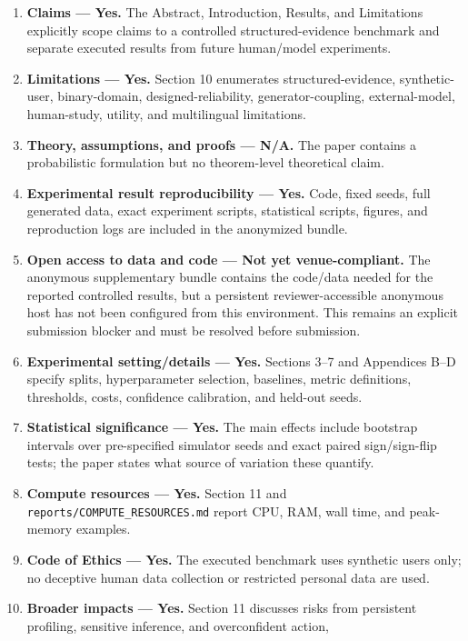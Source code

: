 \documentclass[
  10pt,
  letterpaper,
]{article}
\providecommand{\tightlist}{%
  \setlength{\itemsep}{0pt}\setlength{\parskip}{0pt}}
\begin{document}
\begin{enumerate}
\def\labelenumi{\arabic{enumi}.}
\tightlist
\item
  \textbf{Claims --- Yes.} The Abstract, Introduction, Results, and
  Limitations explicitly scope claims to a controlled
  structured-evidence benchmark and separate executed results from
  future human/model experiments.
\item
  \textbf{Limitations --- Yes.} Section 10 enumerates
  structured-evidence, synthetic-user, binary-domain,
  designed-reliability, generator-coupling, external-model, human-study,
  utility, and multilingual limitations.
\item
  \textbf{Theory, assumptions, and proofs --- N/A.} The paper contains a
  probabilistic formulation but no theorem-level theoretical claim.
\item
  \textbf{Experimental result reproducibility --- Yes.} Code, fixed
  seeds, full generated data, exact experiment scripts, statistical
  scripts, figures, and reproduction logs are included in the anonymized
  bundle.
\item
  \textbf{Open access to data and code --- Not yet venue-compliant.} The
  anonymous supplementary bundle contains the code/data needed for the
  reported controlled results, but a persistent reviewer-accessible
  anonymous host has not been configured from this environment. This
  remains an explicit submission blocker and must be resolved before
  submission.
\item
  \textbf{Experimental setting/details --- Yes.} Sections 3--7 and
  Appendices B--D specify splits, hyperparameter selection, baselines,
  metric definitions, thresholds, costs, confidence calibration, and
  held-out seeds.
\item
  \textbf{Statistical significance --- Yes.} The main effects include
  bootstrap intervals over pre-specified simulator seeds and exact
  paired sign/sign-flip tests; the paper states what source of variation
  these quantify.
\item
  \textbf{Compute resources --- Yes.} Section 11 and
  \texttt{reports/COMPUTE\_RESOURCES.md} report CPU, RAM, wall time, and
  peak-memory examples.
\item
  \textbf{Code of Ethics --- Yes.} The executed benchmark uses synthetic
  users only; no deceptive human data collection or restricted personal
  data are used.
\item
  \textbf{Broader impacts --- Yes.} Section 11 discusses risks from
  persistent profiling, sensitive inference, and overconfident action,

\end{enumerate}
\end{document}
